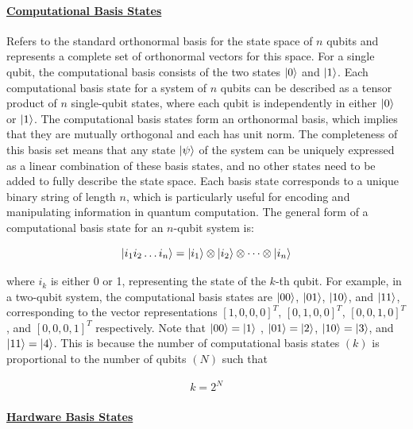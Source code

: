\documentclass[
]{article}
\begin{document}
\paragraph*{\texorpdfstring{\underline{Computational Basis States}}{}}\label{section-13}

Refers to the standard orthonormal basis for the state space of \(n\)
qubits and represents a complete set of orthonormal vectors for this
space. For a single qubit, the computational basis consists of the two
states \(\ket{0}\) and \(\ket{1}\). Each computational basis state for a
system of \(n\) qubits can be described as a tensor product of \(n\)
single-qubit states, where each qubit is independently in either
\(\ket{0}\) or \(\ket{1}\). The computational basis states form an
orthonormal basis, which implies that they are mutually orthogonal and
each has unit norm. The completeness of this basis set means that any
state \(\ket{\psi}\) of the system can be uniquely expressed as a linear
combination of these basis states, and no other states need to be added
to fully describe the state space. Each basis state corresponds to a
unique binary string of length \(n\), which is particularly useful for
encoding and manipulating information in quantum computation. The
general form of a computational basis state for an \(n\)-qubit system
is:

\[
\ket{i_{1} i_{2} \dots i_{n}} = \ket{i_{1}} \otimes \ket{i_{2}} \otimes \cdots \otimes \ket{i_{n}}
\]

where \(i_k\) is either 0 or 1, representing the state of the \(k\)-th
qubit. For example, in a two-qubit system, the computational basis
states are \(\ket{00}\), \(\ket{01}\), \(\ket{10}\), and \(\ket{11}\),
corresponding to the vector representations \([1, 0, 0, 0]^T\),
\([0, 1, 0, 0]^T\), \([0, 0, 1, 0]^T\), and \([0, 0, 0, 1]^T\)
respectively. Note that \(\ket{00} = \ket{1}\) , \(\ket{01}= \ket{2}\),
\(\ket{10}= \ket{3}\), and \(\ket{11}=\ket{4}\). This is because the
number of computational basis states \((k)\) is proportional to the
number of qubits \((N)\) such that

\begin{align}
k = 2^N  
\end{align}

\paragraph*{\texorpdfstring{\underline{Hardware Basis States}}{}}\label{section-14}
\end{document}
